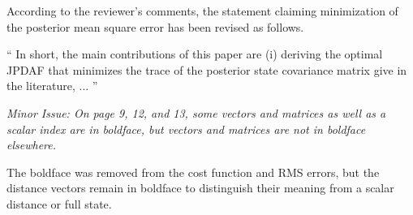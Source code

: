 \documentclass[11pt]{article}
\newenvironment{correction}{\begin{list}{}{\setlength{\leftmargin}{1cm}\setlength{\rightmargin}{1cm}}\vspace{\parsep}\item[]``}{''\end{list}}
\begin{document}
\begin{itemize}
%

According to the reviewer's comments, the statement claiming minimization of the posterior mean square error has been revised as follows.

\begin{correction}
In short, the main contributions of this paper are (i) deriving the optimal JPDAF that minimizes the trace of the posterior state covariance matrix give in the literature, ...
\end{correction}



\item {\itshape Minor Issue:
On page 9, 12, and 13, some vectors and matrices as well as a scalar index are in boldface, but vectors and matrices are not in boldface elsewhere.}

The boldface was removed from the cost function and RMS errors, but the distance vectors remain in boldface to distinguish their meaning from a scalar distance or full state.

\end{itemize}
%
%
\end{document}
